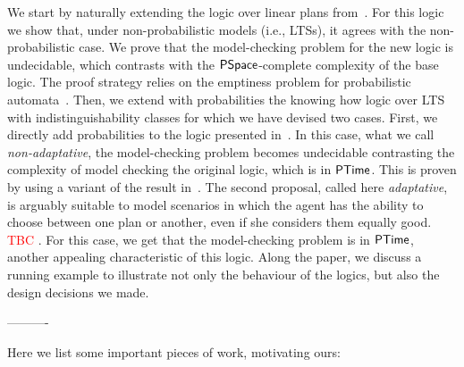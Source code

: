 We start by naturally extending the logic over linear plans from~\cite{Wang15lori,Wang16,Wang2016}.  For this logic we show that, under non-probabilistic models (i.e., LTSs), it agrees with the non-probabilistic case. We prove that the model-checking problem for the new logic is undecidable,  which contrasts  with the ${\rm\textsf{PSpace}}$-complete complexity of the base logic. The proof strategy relies on the emptiness problem for probabilistic automata~\cite{MadaniHC99}. Then, we extend with probabilities the knowing how logic over LTS with indistinguishability classes for which we have devised two cases.  First, we directly add probabilities to the logic presented in~\cite{AFSVQ21,AFSVQ23}. In this case, what we call \emph{non-adaptative}, the model-checking problem becomes undecidable  contrasting the complexity of model checking the original logic, which is in  ${\rm\textsf{PTime}}$. This is proven by using a variant of the result in~\cite{MadaniHC99}. The second proposal, called here \emph{adaptative}, is arguably suitable to model scenarios in which the agent has the ability to choose between one plan or another, even if she considers them equally good. \textcolor{red}{TBC} . For this case, we get that the model-checking problem is in ${\rm\textsf{PTime}}$, another appealing characteristic of this logic. Along the paper, we discuss a running example to illustrate not only the behaviour of the logics, but also the design decisions we made. 

\iffalse
---------- 

Here we list some important pieces of work, motivating ours:

